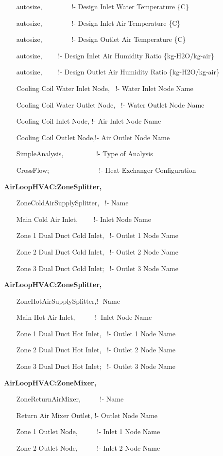~~~ autosize,~~~~~~~~ !- Design Inlet Water Temperature \{C\}

~~~ autosize,~~~~~~~~ !- Design Inlet Air Temperature \{C\}

~~~ autosize,~~~~~~~~ !- Design Outlet Air Temperature \{C\}

~~~ autosize,~~~~ !- Design Inlet Air Humidity Ratio \{kg-H2O/kg-air\}

~~~ autosize,~~~~ !- Design Outlet Air Humidity Ratio \{kg-H2O/kg-air\}

~~~ Cooling Coil Water Inlet Node,~ !- Water Inlet Node Name

~~~ Cooling Coil Water Outlet Node,~ !- Water Outlet Node Name

~~~ Cooling Coil Inlet Node, !- Air Inlet Node Name

~~~ Cooling Coil Outlet Node,!- Air Outlet Node Name

~~~ SimpleAnalysis,~~~~~~~~~ !- Type of Analysis

~~~ CrossFlow;~~~~~~~~~~~~~~ !- Heat Exchanger Configuration

\textbf{AirLoopHVAC:ZoneSplitter,}

~~~ ZoneColdAirSupplySplitter,~ !- Name

~~~ Main Cold Air Inlet,~~~~ !- Inlet Node Name

~~~ Zone 1 Dual Duct Cold Inlet,~ !- Outlet 1 Node Name

~~~ Zone 2 Dual Duct Cold Inlet,~ !- Outlet 2 Node Name

~~~ Zone 3 Dual Duct Cold Inlet;~ !- Outlet 3 Node Name

\textbf{AirLoopHVAC:ZoneSplitter,}

~~~ ZoneHotAirSupplySplitter,!- Name

~~~ Main Hot Air Inlet,~~~~~ !- Inlet Node Name

~~~ Zone 1 Dual Duct Hot Inlet,~ !- Outlet 1 Node Name

~~~ Zone 2 Dual Duct Hot Inlet,~ !- Outlet 2 Node Name

~~~ Zone 3 Dual Duct Hot Inlet;~ !- Outlet 3 Node Name

\textbf{AirLoopHVAC:ZoneMixer,}

~~~ ZoneReturnAirMixer,~~~~~ !- Name

~~~ Return Air Mixer Outlet, !- Outlet Node Name

~~~ Zone 1 Outlet Node,~~~~~ !- Inlet 1 Node Name

~~~ Zone 2 Outlet Node,~~~~~ !- Inlet 2 Node Name

